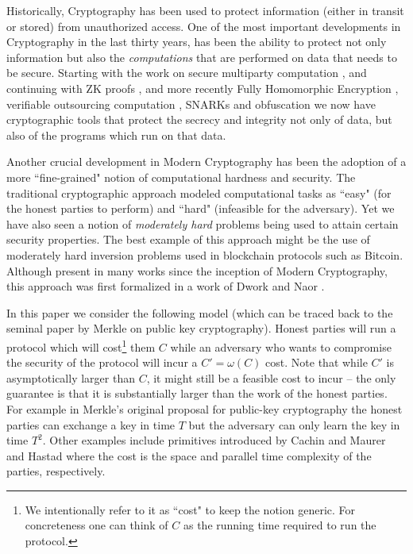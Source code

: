 
Historically, Cryptography has been used to protect information (either in transit or stored) from unauthorized access. One of the most important developments in Cryptography in the last thirty years, has been the ability to protect not only information but also the {\em computations} that are performed on data that needs to be secure. Starting with the work on secure multiparty computation \cite{mpc}, and continuing with ZK proofs \cite{zk}, and more recently Fully Homomorphic Encryption \cite{gentry}, verifiable outsourcing computation \cite{muggles,ggp10}, SNARKs \cite{qap,snark-linear} and obfuscation \cite{garg2016candidate} we now have cryptographic tools that protect the secrecy and integrity not only of data, but also of the programs which run on that data. 

Another crucial development in Modern Cryptography has been the adoption of a more ``fine-grained" notion of computational hardness and security. The traditional cryptographic approach modeled computational tasks as ``easy" (for the honest parties to perform) and ``hard" (infeasible for the adversary). Yet we have also seen a notion of {\em moderately hard} problems being used to attain certain security properties. The best example of this approach might be the use of moderately hard inversion problems used in blockchain protocols such as Bitcoin. Although present in many works since the inception of Modern Cryptography, this approach was first 
formalized in a work of Dwork and Naor \cite{dn-spam}. 

In this paper we consider the following model (which can be traced back to the seminal paper by Merkle \cite{merkle} on public key cryptography). Honest parties will run a protocol which will cost\footnote{
We intentionally refer to it as ``cost" to keep the notion generic. For concreteness one can think of $C$ as the running time required to run the protocol.} 
them $C$ while an adversary who wants to compromise the security of the protocol will incur a $C'=\omega(C)$ cost. Note that while $C'$ is asymptotically larger than $C$, it might still be a feasible cost to incur -- the only guarantee is that it is 
substantially larger than the work of the honest parties. For example in Merkle's original proposal for public-key cryptography the honest parties can exchange a key in time $T$ but the adversary can only learn the key in time $T^2$. Other examples include primitives introduced by Cachin and
Maurer \cite{maurer} and Hastad \cite{H87} where 
the cost is the space and parallel time complexity of the parties, respectively. 

